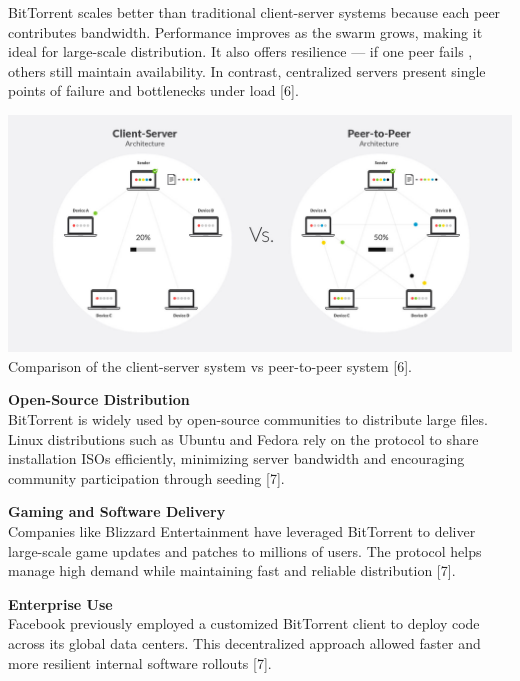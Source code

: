 \documentclass[landscape]{a0poster}
\begin{document}
\begin{multicols*}{3}

BitTorrent scales better than traditional  client-server systems because each peer contributes bandwidth. Performance improves as the swarm grows, making it ideal for large-scale distribution. It also offers resilience — if one peer fails , others still maintain availability. In contrast, centralized servers  present single points of failure and bottlenecks under load [6].

\begin{center}
  \includegraphics[width=1\linewidth]{img/comparison.jpg} \\
  {\footnotesize Comparison of the client-server system vs peer-to-peer system [6].}
\end{center}


\textbf{  Open-Source Distribution} \\
BitTorrent is widely used by open-source communities to distribute  large files. Linux distributions such as Ubuntu and Fedora rely on the protocol to share installation ISOs efficiently, minimizing server bandwidth and encouraging  community participation through seeding [7].

\vspace{1em}

\textbf{Gaming and Software Delivery} \\
Companies like Blizzard Entertainment have leveraged  BitTorrent to deliver large-scale game updates and patches to millions of users. The protocol helps manage high demand while maintaining  fast and reliable distribution [7].

\vspace{1em}

\textbf{Enterprise Use} \\
Facebook previously employed a customized BitTorrent  client to deploy code across its global data centers. This decentralized approach allowed faster  and more resilient internal software rollouts [7].


\end{multicols*}
\end{document}
